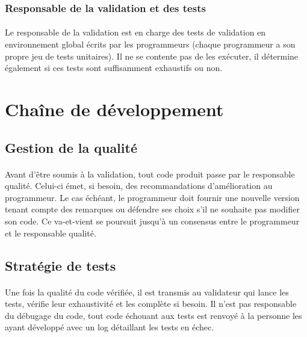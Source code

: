 \documentclass{report}
\begin{document}
\subsubsection{Responsable de la validation et des tests}

\paragraph{}
\hspace{4mm}\textnormal{Le responsable de la validation est en charge des tests de validation en environnement global \'{e}crits par les programmeurs (chaque programmeur a son propre jeu de tests unitaires). Il ne se contente pas de les ex\'{e}cuter,
il d\'{e}termine \'{e}galement si ces tests sont suffisamment exhaustifs ou non.}

\section{Cha\^{i}ne de d\'{e}veloppement}

\subsection{Gestion de la qualit\'{e}}

\paragraph{}
\hspace{4mm}\textnormal{Avant d'\^{e}tre soumis \`{a} la validation, tout code produit passe par le responsable qualit\'{e}. Celui-ci \'{e}met, si besoin,
des recommandations d'am\'{e}lioration au programmeur. Le cas \'{e}ch\'{e}ant, le programmeur doit fournir une nouvelle version tenant compte
des remarques ou d\'{e}fendre ses choix s'il ne souhaite pas modifier son code. Ce va-et-vient se poursuit jusqu'\`{a} un consensus entre le programmeur
et le responsable qualit\'{e}.}

\subsection{Strat\'{e}gie de tests}

\paragraph{}
\hspace{4mm}\textnormal{Une fois la qualit\'{e} du code v\'{e}rifi\'{e}e, il est transmis au validateur qui lance les tests, v\'{e}rifie leur exhaustivit\'{e} et les compl\`{e}te si besoin.
Il n'est pas responsable du d\'{e}bugage du code, tout code \'{e}chouant aux tests est renvoy\'{e} \`{a} la personne les ayant d\'{e}velopp\'{e} avec un log d\'{e}taillant les tests en \'{e}chec.}
\end{document}

